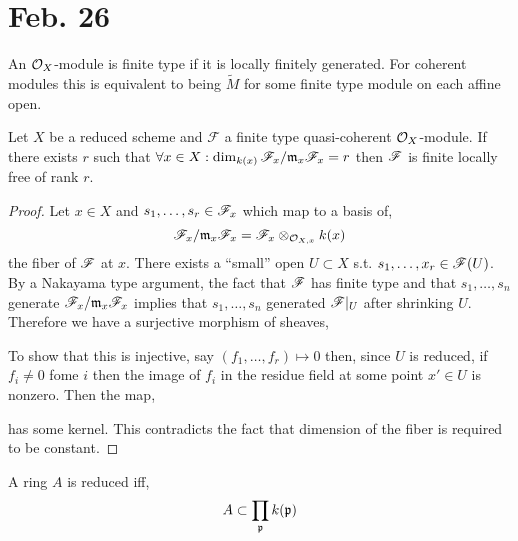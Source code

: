 \documentclass[12pt]{article}
\begin{document}
\section{Feb. 26}

\begin{definition}
An $\mathcal{O}_{X}$-module is finite type if it is locally finitely generated. For coherent modules this is equivalent to being $\widetilde{M}$ for some finite type module on each affine open.
\end{definition}

\begin{proposition}
Let $X$ be a reduced scheme and $\mathcal{F}$ a finite type quasi-coherent $\mathcal{O}_{X}$-module. If there exists $r$ such that $\forall x \in X : \dim_{k(x)} \mathscr{F}_x / \mathfrak{m}_x \mathscr{F}_x = r$ then $\mathscr{F}$ is finite locally free of rank $r$.  
\end{proposition}

\begin{proof}
Let $x \in X$ and $s_1, \dots, s_r \in \mathscr{F}_x$ which map to a basis of,
\[ \mathscr{F}_x / \mathfrak{m}_x \mathscr{F}_x = \mathscr{F}_x \otimes_{\mathcal{O}_{X, x}} k(x) \]
the fiber of $\mathscr{F}$ at $x$. There exists a ``small'' open $U \subset X$ s.t. $s_1, \dots, x_r \in \mathscr{F}(U)$. By a Nakayama type argument, the fact that $\mathscr{F}$ has finite type and that $s_1, \dots, s_n$ generate $\mathscr{F}_x / \mathfrak{m}_x \mathscr{F}_x$ implies that $s_1, \dots, s_n$ generated $\mathscr{F} |_U$ after shrinking $U$. Therefore we have a surjective morphism of sheaves,
\begin{center}
\end{center} 
To show that this is injective, say $(f_1, \dots, f_r) \mapsto 0$ then, since $U$ is reduced, if $f_i \neq 0$ fome $i$ then the image of $f_i$ in the residue field at some point $x' \in U$ is nonzero. Then the map,
\begin{center}
\end{center}
has some kernel. This contradicts the fact that dimension of the fiber is required to be constant. 
\end{proof}

\begin{lemma}
A ring $A$ is reduced iff,
\[ A \subset \prod_{\mathfrak{p}} k(\mathfrak{p}) \]
\end{lemma}
\end{document}
